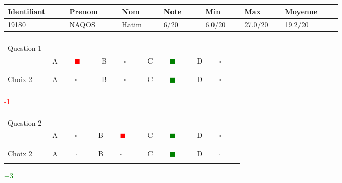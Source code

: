 \documentclass{book}%
\begin{document}
%
\normalsize%
\newpage%
\thispagestyle{empty}%
\begin{tabular}{|l|l|l|l|l|l|l| }%
\hline%
Identifiant $\qquad$ & Prenom $\qquad$ & Nom $\qquad$ & Note $\qquad$ & Min $\qquad$ & Max $\qquad$ & Moyenne $\qquad$ \\%
\hline%
19180&NAQOS&Hatim&6/20&6.0/20 &27.0/20 & 19.2/20\\%
\hline%
\end{tabular}%
\thispagestyle{empty}%
\begin{center}%
\begin{tabular}{| l  l  l  l  l |}%
\hline%
 & & & & \\%
Question 1\qquad \qquad\ & & & & \\%
& A \textcolor{red}{$\qquad \blacksquare \qquad$}& B $\qquad \square \qquad$& C \textcolor{green}{$\qquad \blacksquare \qquad$}& D $\qquad \square \qquad$\\%
 & & & & \\%
\hline%
 & & & &  \\%
Choix 2& A $\qquad \square \qquad$& B $\qquad \square \qquad$& C \textcolor{green}{$\qquad \blacksquare \qquad$}& D $\qquad \square \qquad$\\%
 & & & &  \\%
\hline%
\end{tabular}%
 \qquad  \textcolor{red}{-1}%
\\ \vskip3mm%
\end{center}%
\thispagestyle{empty}%
\begin{center}%
\begin{tabular}{| l  l  l  l  l |}%
\hline%
 & & & & \\%
Question 2\qquad \qquad\ & & & & \\%
& A $\qquad \square \qquad$& B \textcolor{red}{$\qquad \blacksquare \qquad$}& C \textcolor{green}{$\qquad \blacksquare \qquad$}& D $\qquad \square \qquad$\\%
 & & & & \\%
\hline%
 & & & &  \\%
Choix 2& A $\qquad \square \qquad$& B $\qquad \square \qquad$& C \textcolor{green}{$\qquad \blacksquare \qquad$}& D $\qquad \square \qquad$\\%
 & & & &  \\%
\hline%
\end{tabular}%
 \qquad  \textcolor{green}{+3}%
\\ \vskip3mm%
\end{center}%
\thispagestyle{empty}%
\end{document}
